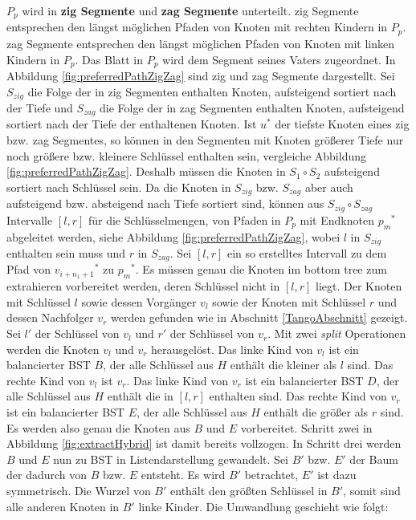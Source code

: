 \documentclass[a4paper,12pt]{article}
\begin{document}
$P_p$ wird in \textbf{zig Segmente} und \textbf{zag Segmente} unterteilt.  zig Segmente entsprechen den längst möglichen Pfaden von Knoten mit rechten Kindern in $P_p$. zag Segmente entsprechen den längst möglichen Pfaden von Knoten mit linken Kindern in $P_p$. Das Blatt in $P_p$ wird dem Segment seines Vaters zugeordnet. In Abbildung  \ref{fig:preferredPathZigZag} sind zig und zag Segmente dargestellt.  Sei $S_{zig}$ die Folge der in zig Segmenten enthalten Knoten, aufsteigend sortiert nach der Tiefe und $S_{zag}$ die Folge der in zag Segmenten enthalten Knoten, aufsteigend sortiert nach der Tiefe der enthaltenen Knoten. Ist $u^*$ der tiefste Knoten eines zig bzw. zag Segmentes, so können in den Segmenten mit Knoten größerer Tiefe nur noch größere bzw. kleinere Schlüssel enthalten sein, vergleiche Abbildung \ref{fig:preferredPathZigZag}. Deshalb müssen die Knoten in $S_1 \circ S_2$ aufsteigend sortiert nach Schlüssel sein. Da die Knoten in $S_{zig}$ bzw. $S_{zag}$ aber auch aufsteigend bzw. absteigend nach Tiefe sortiert sind, können aus $S_{zig} \circ S_{zag}$ Intervalle $\left[l, r\right]$ für die Schlüsselmengen, von Pfaden in $P_p$ mit Endknoten ${p_m}^*$ abgeleitet werden, siehe Abbildung \ref{fig:preferredPathZigZag}, wobei $l$ in $S_{zig}$ enthalten sein muss und $r$ in $S_{zag}$.  Sei $\left[l,r\right]$ ein so erstelltes Intervall zu dem Pfad von ${v_{i + {n_1} + 1}}^*$ zu ${p_m}^*$. Es müssen genau die Knoten im bottom tree zum extrahieren vorbereitet werden, deren Schlüssel nicht in $\left[l, r\right]$ liegt. Der Knoten mit Schlüssel $l$ sowie dessen Vorgänger $v_l$ sowie der Knoten mit Schlüssel $r$ und dessen Nachfolger $v_r$ werden gefunden wie in Abschnitt \ref{TangoAbschnitt} gezeigt. Sei $l'$ der Schlüssel von $v_l$ und $r'$ der Schlüssel von $v_r$. Mit zwei \textit{split} Operationen werden die Knoten $v_l$ und $v_r$ herausgelöst. Das linke Kind von $v_l$ ist ein balancierter BST $B$, der alle Schlüssel aus $H$ enthält die kleiner als $l$ sind. Das rechte Kind von $v_l$ ist $v_r$. Das linke Kind von $v_r$ ist ein balancierter BST $D$, der alle Schlüssel aus $H$ enthält die in $\left[l, r\right]$ enthalten sind.  Das rechte  Kind von $v_r$ ist ein balancierter BST $E$, der alle Schlüssel aus $H$ enthält die größer als $r$ sind. Es werden also genau die Knoten aus $B$ und $E$ vorbereitet. Schritt zwei in Abbildung \ref{fig:extractHybrid} ist damit bereits vollzogen. In Schritt drei werden $B$ und $E$ nun zu BST in Listendarstellung gewandelt. Sei $B'$ bzw. $E'$ der Baum der dadurch von $B$ bzw. $E$ entsteht. Es wird $B'$ betrachtet, $E'$ ist dazu symmetrisch.  Die Wurzel von $B'$ enthält den größten Schlüssel in $B'$, somit sind alle anderen Knoten in $B'$ linke Kinder. Die Umwandlung geschieht wie folgt:\\
\end{document}
